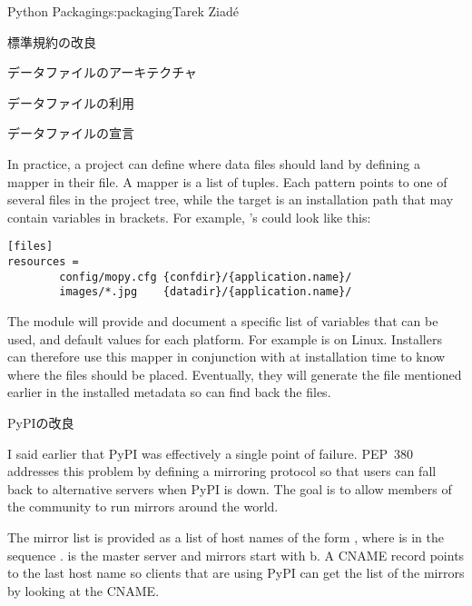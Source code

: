 \begin{aosachapter}{Python Packaging}{s:packaging}{Tarek Ziad\'{e}}
\begin{aosasect1}{標準規約の改良}
\begin{aosasect2}{データファイルのアーキテクチャ}
\begin{aosasect3}{データファイルの利用}
\end{aosasect3}

\begin{aosasect3}{データファイルの宣言}

In practice, a project can define where data files should land by
defining a mapper in their  file.  A mapper is a
list of  tuples. Each pattern
points to one of several files in the project tree, while the target
is an installation path that may contain variables in brackets.  For
example, 's  could look like this:

\begin{verbatim}
[files]
resources =
        config/mopy.cfg {confdir}/{application.name}/
        images/*.jpg    {datadir}/{application.name}/
\end{verbatim}

\noindent
The  module will provide and document a specific list
of variables that can be used, and default values for each platform.
For example  is  on Linux.  Installers can
therefore use this mapper in conjunction with  at
installation time to know where the files should be placed.
Eventually, they will generate the  file mentioned
earlier in the installed metadata so  can find back the
files.


\end{aosasect3}

\end{aosasect2}

\begin{aosasect2}{PyPIの改良}

I said earlier that PyPI was effectively a single point of
failure. PEP~380 addresses this problem by defining a mirroring
protocol so that users can fall back to alternative servers when PyPI
is down. The goal is to allow members of the community to run mirrors
around the world.


The mirror list is provided as a list of host names of the form
, where  is in the sequence
.   is the master
server and mirrors start with b. A CNAME record
 points to the last host name so clients
that are using PyPI can get the list of the mirrors by looking at the
CNAME.


\end{aosasect2}
\end{aosasect1}
\end{aosachapter}
